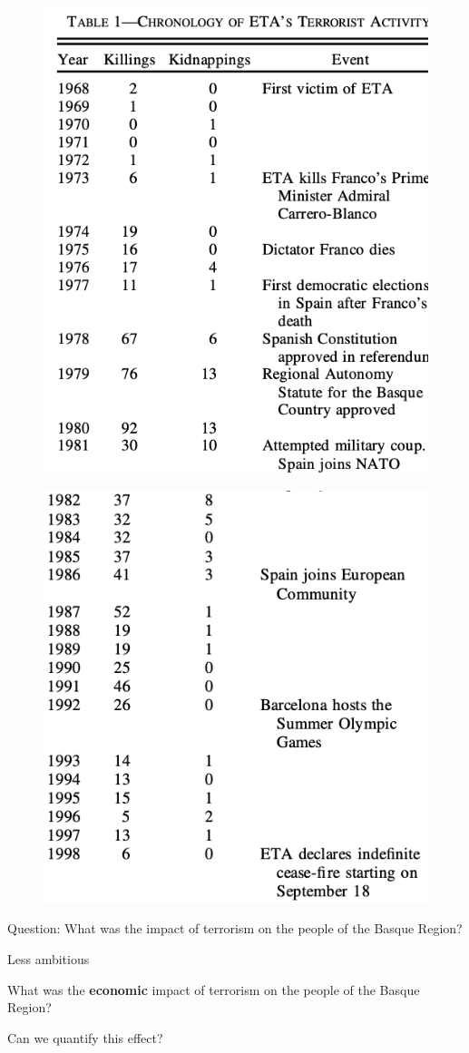 \documentclass[notes,11pt, aspectratio=169]{beamer}
\newenvironment{wideitemize}{\itemize\addtolength{\itemsep}{10pt}}{\enditemize}
\begin{document}
\begin{frame}{}
    \begin{figure}
        \includegraphics[width = .4\linewidth]{figures/tab11.png}
    \end{figure}
\end{frame}

\begin{frame}{}
    \begin{figure}
        \includegraphics[width = .4\linewidth]{figures/tab12.png}
    \end{figure}
\end{frame}

\begin{frame}{}
    \begin{wideitemize}
        \item Question: What was the impact of terrorism on the people of the Basque Region? \pause 
        \item Less ambitious
        \begin{wideitemize} 
            \item What was the \textbf{economic} impact of terrorism on the people of the Basque Region? 
            \item Can we quantify this effect?
        \end{wideitemize}
    \end{wideitemize}
\end{frame}
\end{document}
